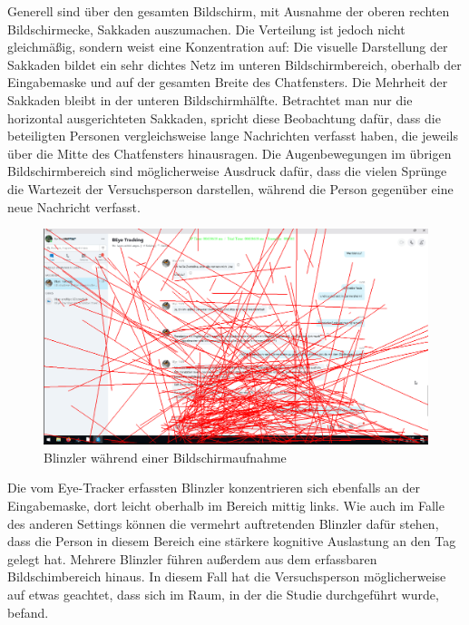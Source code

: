 
\begin{sloppypar}
Generell sind über den gesamten Bildschirm, mit Ausnahme der oberen rechten Bildschirmecke, Sakkaden auszumachen. Die Verteilung ist jedoch nicht gleichmäßig, sondern weist eine Konzentration auf: Die visuelle Darstellung der Sakkaden bildet ein sehr dichtes Netz im unteren Bildschirmbereich, oberhalb der Eingabemaske und auf der gesamten Breite des Chatfensters. Die Mehrheit der Sakkaden bleibt in der unteren Bildschirmhälfte. Betrachtet man nur die horizontal ausgerichteten Sakkaden, spricht diese Beobachtung dafür, dass die beteiligten Personen vergleichsweise lange Nachrichten verfasst haben, die jeweils über die Mitte des Chatfensters hinausragen. Die Augenbewegungen im übrigen Bildschirmbereich sind möglicherweise Ausdruck dafür, dass die vielen Sprünge die Wartezeit der Versuchsperson darstellen, während die Person gegenüber eine neue Nachricht verfasst.
\end{sloppypar}


\begin{figure}
    \includegraphics[width=\textwidth]{Figures/Fixmaps/DeDe/Overlay_Image_DD_TN7_Trial_1_Blinks}
	\caption{Blinzler während einer Bildschirmaufnahme}
    \label{K6:fig:blinks_DD_TN7}
\end{figure}



Die vom Eye-Tracker erfassten Blinzler konzentrieren sich ebenfalls an der Eingabemaske, dort leicht oberhalb im Bereich mittig links. Wie auch im Falle des anderen Settings können die vermehrt auftretenden Blinzler dafür stehen, dass die Person in diesem Bereich eine stärkere kognitive Auslastung an den Tag gelegt hat. Mehrere Blinzler führen außerdem aus dem erfassbaren Bildschimbereich hinaus. In diesem Fall hat die Versuchsperson möglicherweise auf etwas geachtet, dass sich im Raum, in der die Studie durchgeführt wurde, befand.

